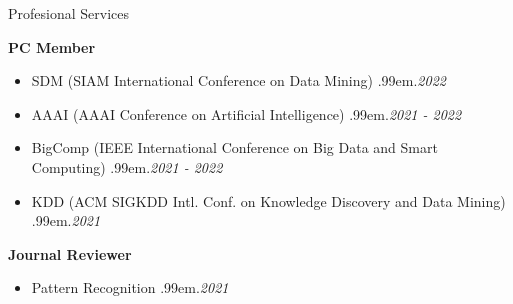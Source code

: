 \documentclass{resume} %
\makeatletter
\newcommand \Dotfill {\leavevmode \cleaders \hb@xt@ .99em{\hss .\hss }\hfill \kern \z@}
\makeatother
\begin{document}
\begin{rSection}{Profesional Services}

\textbf{PC Member}
\begin{itemize}[noitemsep]
	\item SDM {\small (SIAM International Conference on Data Mining)} \smallskip \Dotfill \emph{2022}
	\item AAAI {\small (AAAI Conference on Artificial Intelligence)} \smallskip \Dotfill \emph{2021 - 2022}
	\item BigComp {\small (IEEE International Conference on Big Data and Smart Computing)} \smallskip \Dotfill \emph{2021 - 2022}
	\item KDD {\small (ACM SIGKDD Intl. Conf. on Knowledge Discovery and Data Mining)} \smallskip \Dotfill \emph{2021}
\end{itemize}

\textbf{Journal Reviewer}
\begin{itemize}[noitemsep]
	\item Pattern Recognition \smallskip \Dotfill \emph{2021}
\end{itemize}


\end{rSection}

\end{document}
